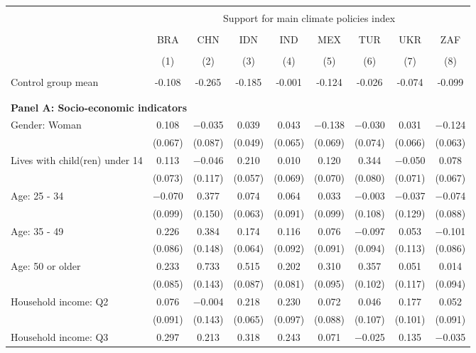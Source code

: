 
\begin{tabular}{@{\extracolsep{5pt}}lcccccccc} 
\\[-1.8ex]\hline 
\hline \\[-1.8ex] 
 & \multicolumn{8}{c}{Support for main climate policies index} \\ 
\cline{2-9} 
\\[-1.8ex] & BRA & CHN & IDN & IND & MEX & TUR & UKR & ZAF \\ 
\\[-1.8ex] & (1) & (2) & (3) & (4) & (5) & (6) & (7) & (8)\\ 
\hline \\[-1.8ex] 
Control group mean & -0.108 & -0.265 & -0.185 & -0.001 & -0.124 & -0.026 & -0.074 & -0.099   \\ \hline \\[-1.8ex]
\\[1ex]
\multicolumn{ 9 }{l}{\textbf{ Panel A: Socio-economic indicators }} \\
 Gender: Woman & 0.108 & $-$0.035 & 0.039 & 0.043 & $-$0.138 & $-$0.030 & 0.031 & $-$0.124 \\ 
  & (0.067) & (0.087) & (0.049) & (0.065) & (0.069) & (0.074) & (0.066) & (0.063) \\ 
  Lives with child(ren) under 14 & 0.113 & $-$0.046 & 0.210 & 0.010 & 0.120 & 0.344 & $-$0.050 & 0.078 \\ 
  & (0.073) & (0.117) & (0.057) & (0.069) & (0.070) & (0.080) & (0.071) & (0.067) \\ 
  Age: 25 - 34 & $-$0.070 & 0.377 & 0.074 & 0.064 & 0.033 & $-$0.003 & $-$0.037 & $-$0.074 \\ 
  & (0.099) & (0.150) & (0.063) & (0.091) & (0.099) & (0.108) & (0.129) & (0.088) \\ 
  Age: 35 - 49 & 0.226 & 0.384 & 0.174 & 0.116 & 0.076 & $-$0.097 & 0.053 & $-$0.101 \\ 
  & (0.086) & (0.148) & (0.064) & (0.092) & (0.091) & (0.094) & (0.113) & (0.086) \\ 
  Age: 50 or older & 0.233 & 0.733 & 0.515 & 0.202 & 0.310 & 0.357 & 0.051 & 0.014 \\ 
  & (0.085) & (0.143) & (0.087) & (0.081) & (0.095) & (0.102) & (0.117) & (0.094) \\ 
  Household income: Q2 & 0.076 & $-$0.004 & 0.218 & 0.230 & 0.072 & 0.046 & 0.177 & 0.052 \\ 
  & (0.091) & (0.143) & (0.065) & (0.097) & (0.088) & (0.107) & (0.101) & (0.091) \\ 
  Household income: Q3 & 0.297 & 0.213 & 0.318 & 0.243 & 0.071 & $-$0.025 & 0.135 & $-$0.035 \\ 

\end{tabular}
